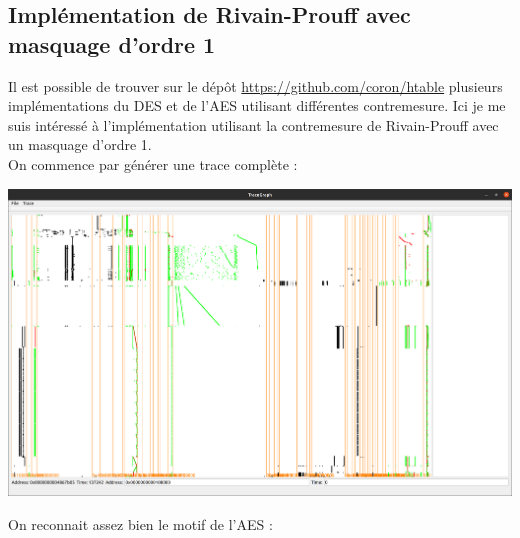 \documentclass[10pt,a4paper]{article}
\begin{document}
\subsection{Implémentation de Rivain-Prouff avec masquage d'ordre 1}
Il est possible de trouver sur le dépôt \href{https://github.com/coron/htable}{https://github.com/coron/htable} plusieurs implémentations du DES et de l'AES utilisant différentes contremesure. Ici je me suis intéressé à l'implémentation utilisant la contremesure de Rivain-Prouff avec un masquage d'ordre 1.\\
On commence par générer une trace complète :

\begin{center}
\includegraphics[scale=0.11]{Images/Rivain_Prouff_sans_filtre.png}\\
\end{center}
On reconnait assez bien le motif de l'AES :
\end{document}
